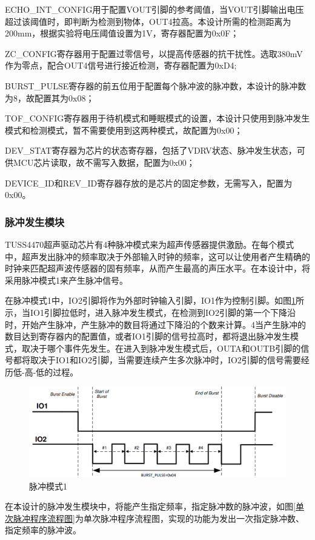     ECHO\_INT\_CONFIG用于配置VOUT引脚的参考阈值，当VOUT引脚输出电压超过该阈值时，即判断为检测到物体，OUT4拉高。本设计所需的检测距离为200mm，根据实验将电压阈值设置为1V，寄存器配置为0x0F；\par
    ZC\_CONFIG寄存器用于配置过零信号，以提高传感器的抗干扰性。选取380mV作为零点，配合OUT4信号进行接近检测，寄存器配置为0xD4;\par
    BURST\_PULSE寄存器的前五位用于配置每个脉冲波的脉冲数，本设计的脉冲数为8，故配置其为0x08；\par
    TOF\_CONFIG寄存器用于待机模式和睡眠模式的设置，本设计只使用到脉冲发生模式和检测模式，暂不需要使用到这两种模式，故配置为0x00；\par
    DEV\_STAT寄存器为芯片的状态寄存器，包括了VDRV状态、脉冲发生状态，可供MCU芯片读取，故不需写入数据，配置为0x00；\par
    DEVICE\_ID和REV\_ID寄存器存放的是芯片的固定参数，无需写入，配置为0x00。
    
    \subsubsection{脉冲发生模块}
    TUSS4470超声驱动芯片有4种脉冲模式来为超声传感器提供激励。在每个模式中，超声发出脉冲的频率取决于外部输入时钟的频率，这可以让使用者产生精确的时钟来匹配超声波传感器的固有频率，从而产生最高的声压水平。在本设计中，将采用脉冲模式1来产生脉冲信号。\par
    在脉冲模式1中，IO2引脚将作为外部时钟输入引脚，IO1作为控制引脚。如图\ref{脉冲模式1}所示，当IO1引脚拉低时，进入脉冲发生模式，在检测到IO2引脚的第一个下降沿时，开始产生脉冲，产生脉冲的数目将通过下降沿的个数来计算。4当产生脉冲的数目达到寄存器内的配置值，或者IO1引脚的信号拉高时，都将退出脉冲发生模式，取决于哪个事件先发生。在进入到脉冲发生模式后，OUTA和OUTB引脚的信号都将取决于IO1和IO2引脚，当需要连续产生多次脉冲时，IO2引脚的信号需要经历低-高-低的过程。
     \begin{figure}[ht]
        \centering
        \includegraphics[width=12cm]{figure/IO MODE1.png}
        \caption{脉冲模式1}
        \label{脉冲模式1}
    \end{figure}
    在本设计的脉冲发生模块中，将能产生指定频率，指定脉冲数的脉冲波，如图\ref{单次脉冲程序流程图}为单次脉冲程序流程图，实现的功能为发出一次指定脉冲数、指定频率的脉冲波。
    
